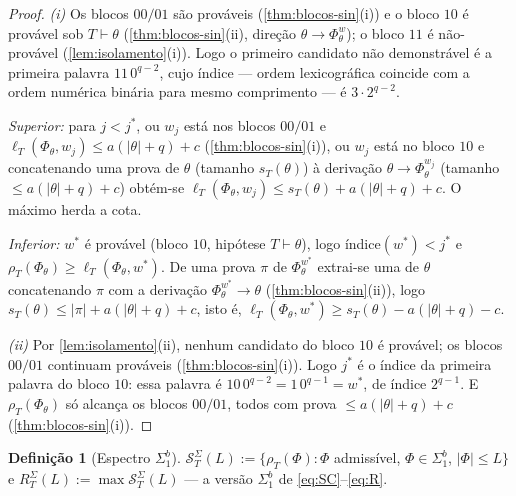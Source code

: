 \documentclass[11pt,a4paper]{article}
\theoremstyle{definition}
\newtheorem{definition}[theorem]{Definição}
\theoremstyle{remark}
\begin{document}
\begin{proof}
\emph{(i)} Os blocos $00/01$ são prováveis (\cref{thm:blocos-sin}(i)) e o
bloco $10$ é provável sob $T \vdash \theta$ (\cref{thm:blocos-sin}(ii),
direção $\theta \rightarrow \Phi_\theta^{w}$); o bloco $11$ é não-provável
(\cref{lem:isolamento}(i)). Logo o primeiro candidato não demonstrável é a
primeira palavra $11\,0^{q-2}$, cujo índice --- ordem lexicográfica coincide
com a ordem numérica binária para mesmo comprimento ---
é $3 \cdot 2^{q-2}$.

\emph{Superior:} para $j < j^{*}$, ou $w_j$ está nos blocos $00/01$ e
$\ell_T(\Phi_\theta, w_j) \leq a(\lvert\theta\rvert+q)+c$
(\cref{thm:blocos-sin}(i)), ou $w_j$ está no bloco $10$ e concatenando uma
prova de $\theta$ (tamanho $s_T(\theta)$) à derivação
$\theta \rightarrow \Phi_\theta^{w_j}$ (tamanho
$\leq a(\lvert\theta\rvert+q)+c$) obtém-se
$\ell_T(\Phi_\theta, w_j) \leq s_T(\theta) + a(\lvert\theta\rvert+q)+c$.
O máximo herda a cota.

\emph{Inferior:} $w^{*}$ é provável (bloco $10$, hipótese $T \vdash \theta$),
logo índice$(w^{*}) < j^{*}$ e
$\rho_T(\Phi_\theta) \geq \ell_T(\Phi_\theta, w^{*})$. De uma prova $\pi$ de
$\Phi_\theta^{w^{*}}$ extrai-se uma de $\theta$ concatenando $\pi$ com a
derivação $\Phi_\theta^{w^{*}} \rightarrow \theta$
(\cref{thm:blocos-sin}(ii)), logo
$s_T(\theta) \leq \lvert\pi\rvert + a(\lvert\theta\rvert+q)+c$, isto é,
$\ell_T(\Phi_\theta, w^{*}) \geq s_T(\theta) - a(\lvert\theta\rvert+q) - c$.

\emph{(ii)} Por \cref{lem:isolamento}(ii), nenhum candidato do bloco $10$ é
provável; os blocos $00/01$ continuam prováveis (\cref{thm:blocos-sin}(i)).
Logo $j^{*}$ é o índice da primeira palavra do bloco $10$: essa palavra é
$10\,0^{q-2} = 1\,0^{q-1} = w^{*}$, de índice $2^{q-1}$. E $\rho_T(\Phi_\theta)$
só alcança os blocos $00/01$, todos com prova
$\leq a(\lvert\theta\rvert+q)+c$ (\cref{thm:blocos-sin}(i)).
\end{proof}

\begin{definition}[Espectro $\Sigma^{b}_{1}$]\label{def:espectro-sigma}
$\mathcal{S}^{\Sigma}_T(L) := \{ \rho_T(\Phi) : \Phi$ admissível,
$\Phi \in \Sigma^{b}_{1}$, $\lvert\Phi\rvert \leq L \}$ e
$R^{\Sigma}_T(L) := \max \mathcal{S}^{\Sigma}_T(L)$ --- a versão
$\Sigma^{b}_{1}$ de \eqref{eq:SC}--\eqref{eq:R}.
\end{definition}
\end{document}
